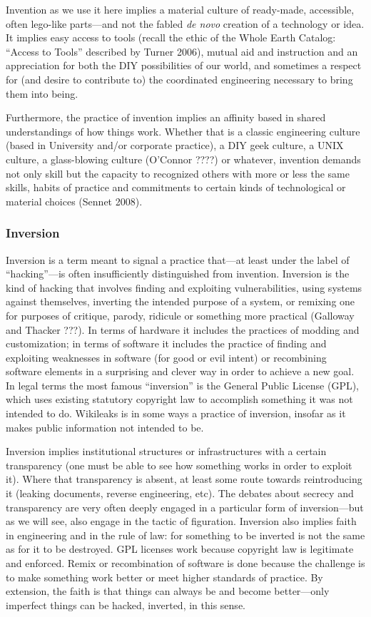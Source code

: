 \documentclass[10pt,letter,oneside]{scrartcl}
\begin{document}
Invention as we use it here implies a material culture of ready-made,
accessible, often lego-like parts---and not the fabled \emph{de novo} creation
of a technology or idea.  It implies easy access to tools (recall the ethic of
the Whole Earth Catalog: ``Access to Tools'' described by Turner 2006), mutual
aid and instruction and an appreciation for both the DIY possibilities of our
world, and sometimes a respect for (and desire to contribute to) the coordinated
engineering necessary to bring them into being.

Furthermore, the practice of invention implies an affinity based in shared
understandings of how things work.  Whether that is a classic engineering
culture (based in University and/or corporate practice), a DIY geek culture, a
UNIX culture, a glass-blowing culture (O’Connor ????) or whatever, invention 
demands not only skill but the capacity to recognized others with more or less the 
same skills, habits of practice and commitments to certain kinds of 
technological or material choices (Sennet 2008).

\subsubsection{Inversion}

Inversion is a term meant to signal a practice that---at least under the label
of ``hacking''---is often insufficiently distinguished from invention.
Inversion is the kind of hacking that involves finding and exploiting
vulnerabilities, using systems against themselves, inverting the intended
purpose of a system, or remixing one for purposes of critique, parody, ridicule
or something more practical (Galloway and Thacker ???).  In terms of hardware it
includes the practices of modding and customization; in terms of software it
includes the practice of finding and exploiting weaknesses in software (for good
or evil intent) or recombining software elements in a surprising and clever way
in order to achieve a new goal.  In legal terms the most famous ``inversion'' is
the General Public License (GPL), which uses existing statutory copyright law to
accomplish something it was not intended to do.  Wikileaks is in some ways a
practice of inversion, insofar as it makes public information not intended to
be. 

Inversion implies institutional structures or infrastructures with a certain
transparency (one must be able to see how something works in order to exploit
it).  Where that transparency is absent, at least some route towards
reintroducing it (leaking documents, reverse engineering, etc). The debates
about secrecy and transparency are very often deeply engaged in a particular
form of inversion---but as we will see, also engage in the tactic of figuration.
Inversion also implies faith in engineering and in the rule of law: for
something to be inverted is not the same as for it to be destroyed.  GPL
licenses work because copyright law is legitimate and enforced.  Remix or
recombination of software is done because the challenge is to make something
work better or meet higher standards of practice.  By extension, the faith is
that things can always be and become better—only imperfect things can be hacked,
inverted, in this sense.
\end{document}
